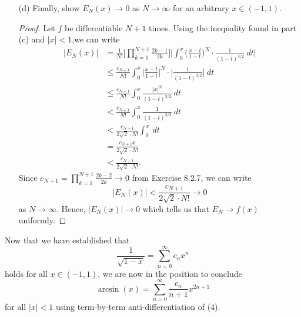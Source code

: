 \begin{enumerate}
\begin{proof}[Solution]
\begin{align*}
                                                     &= |  x -t  | \\
                                                     &\leq |  x  |
        \end{align*}
        which holds for \(  t   \).
        \end{proof}
    \item[(d)] Finally, show \( E_{N}(x) \to 0  \) as \( N \to \infty  \) for an arbitrary \( x \in (-1 , 1) \).
        \begin{proof}
        Let \( f  \) be differentiable \( N + 1  \) times. Using the inequality found in part (c) and \( |  x  |  < 1  \),we can write 
        \begin{align*}
            |E_{N}(x)| &= \frac{ 1 }{ N! } \Big[ \prod_{k=1}^{N+1}   \frac{ 2k-1 }{ 2k }  \Big] \Big| \int_{ 0 }^{ x }  \Big( \frac{ x- t  }{ 1 -t  }  \Big)^{N} \cdot \frac{ 1  }{ (1 -t)^{3/2} }  \ dt \Big|  \\
            &\leq \frac{ c_{N+1} }{ N! }  \int_{ 0 }^{ x  } \Big|  \frac{ x -t  }{ 1 - t  } \Big|^{N}      \cdot \Big|  \frac{ 1 }{ (1-t)^{3/2} } \Big| \  dt   \\
            &\leq \frac{ c_{N+1} }{ N! }  \int_{ 0 }^{ x }  \frac{ |x|^{N} }{  (1-t)^{3/2} } \  dt \\
                     &< \frac{ c_{N+1} }{ N! }   \int_{ 0 }^{ x }  \frac{ 1 }{ (1-t)^{3/2} } \  dt \\
                     &< \frac{ c_{N+1} }{ 2\sqrt{ 2 } \cdot N!  }  \int_{ 0 }^{ x }  \ dt  \\
                     &= \frac{ c_{N+1} x  }{ 2 \sqrt{ 2 }  \cdot N!  }   \\
                     &< \frac{ c_{N+1} }{ 2 \sqrt{ 2 }  \cdot N!  }.
        \end{align*}
        Since \( c_{N+1} = \prod_{k=1}^{N+1} \frac{ 2k-2 }{ 2k } \to 0  \) from Exercise 8.2.7, we can write
        \[ | E_{N}(x) | < \frac{ c_{N+1} }{ 2 \sqrt{ 2 }  \cdot N!  }  \to 0  \]
        as \( N \to \infty  \). 
        Hence, \( |E_{N}(x)| \to 0  \) which tells us that \( E_{N} \to f(x)  \) uniformly.
        \end{proof}
\end{enumerate}
Now that we have established that 
\[  \frac{ 1 }{ \sqrt{ 1 - x  }  }  = \sum_{ n=0 }^{ \infty  } c_{n} x^{n} \tag{4}  \] holds for all \( x \in (-1,1 ) \), we are now in the position to conclude 
\[  \arcsin(x) = \sum_{ n=0  }^{ \infty  } \frac{ c_{n} }{  n+1  } x^{2n+1}  \] for all \( |  x  |  < 1  \) using term-by-term anti-differentiation of (4).

